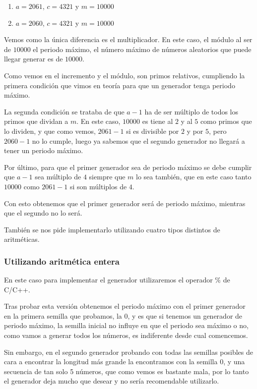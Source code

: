 \documentclass[12pt, spanish]{article}
\begin{document}
\begin{enumerate}
	\item $a = 2061$, $c = 4321$ y $m = 10000$
	\item $a = 2060$, $c = 4321$ y $m = 10000$

\end{enumerate}

Vemos como la única diferencia es el multiplicador. En este caso, el módulo al ser de $10000$ el periodo máximo, el número máximo de números aleatorios que puede llegar generar es de $10000$.

Como vemos en el incremento y el módulo, son primos relativos, cumpliendo la primera condición que vimos en teoría para que un generador tenga periodo máximo.

La segunda condición se trataba de que $a - 1$ ha de ser múltiplo de todos los primos que dividan a $m$. En este caso, $10000$ es tiene al $2$ y al $5$ como primos que lo dividen, y que como vemos, $2061 - 1$ si es divisible por $2$ y por $5$, pero $2060 - 1$ no lo cumple, luego ya sabemos que el segundo generador no llegará a tener un periodo máximo.

Por último, para que el primer generador sea de periodo máximo se debe cumplir que $a - 1$ sea múltiplo de $4$ siempre que $m$ lo sea también, que en este caso tanto $10000$ como $2061 - 1$ si son múltiplos de $4$.

Con esto obtenemos que el primer generador será de periodo máximo, mientras que el segundo no lo será.


También se nos pide implementarlo utilizando cuatro tipos distintos de aritméticas.

\subsubsection{Utilizando aritmética entera}

En este caso para implementar el generador utilizaremos el operador $\%$ de C/C++.

Tras probar esta versión obtenemos el periodo máximo con el primer generador en la primera semilla que probamos, la 0, y es que si tenemos un generador de periodo máximo, la semilla inicial no influye en que el periodo sea máximo o no, como vamos a generar todos los números, es indiferente desde cual comencemos.

Sin embargo, en el segundo generador probando con todas las semillas posibles de cara a encontrar la longitud más grande la encontramos con la semilla 0, y una secuencia de tan solo 5 números, que como vemos es bastante mala, por lo tanto el generador deja mucho que desear y no sería recomendable utilizarlo.
\end{document}

